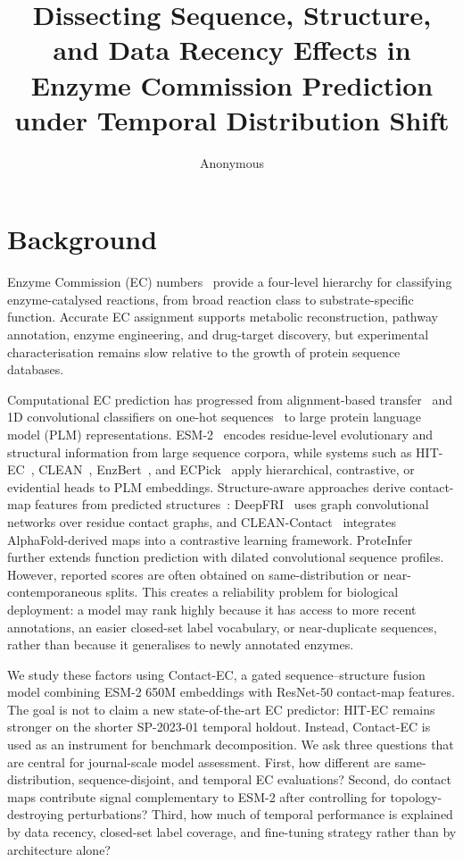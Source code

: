 \documentclass[numbered,contemporary,mediumone]{oup-authoring-template}
\title[Temporal EC Prediction]{Dissecting Sequence, Structure, and Data Recency Effects
in Enzyme Commission Prediction under Temporal Distribution Shift}
\author[1,$\ast$]{Anonymous}
\begin{document}
\maketitle
\thispagestyle{plain}
\pagestyle{plain}
\linenumbers

\section{Background}

Enzyme Commission (EC) numbers~\citep{mcdonald2023} provide a four-level hierarchy
for classifying enzyme-catalysed reactions, from broad reaction class to
substrate-specific function. Accurate EC assignment supports metabolic
reconstruction, pathway annotation, enzyme engineering, and drug-target
discovery, but experimental characterisation remains slow relative to the
growth of protein sequence databases.

Computational EC prediction has progressed from alignment-based
transfer~\citep{altschul1990} and 1D convolutional classifiers on one-hot
sequences~\citep{ryu2019,dalkiran2018} to large protein language model (PLM)
representations. ESM-2~\citep{lin2023} encodes residue-level evolutionary and
structural information from large sequence corpora, while systems such as
HIT-EC~\citep{dumontet2026}, CLEAN~\citep{yu2023}, EnzBert~\citep{buton2023},
and ECPick~\citep{han2024} apply hierarchical, contrastive, or evidential heads
to PLM embeddings. Structure-aware approaches derive contact-map features from
predicted structures~\citep{jumper2021,varadi2022}: DeepFRI~\citep{gligorijevic2021}
uses graph convolutional networks over residue contact graphs, and
CLEAN-Contact~\citep{ayres2024} integrates AlphaFold-derived maps into a
contrastive learning framework. ProteInfer~\citep{sanderson2023} further extends
function prediction with dilated convolutional sequence profiles. However,
reported scores are often obtained on same-distribution or near-contemporaneous
splits. This creates a reliability problem for biological deployment: a model
may rank highly because it has access to more recent annotations, an easier
closed-set label vocabulary, or near-duplicate sequences, rather than because
it generalises to newly annotated enzymes.

We study these factors using Contact-EC, a gated sequence--structure fusion model
combining ESM-2 650M embeddings with ResNet-50 contact-map features. The goal is
not to claim a new state-of-the-art EC predictor: HIT-EC remains stronger on the
shorter SP-2023-01 temporal holdout. Instead, Contact-EC is used as an instrument for benchmark
decomposition. We ask three questions that are central for journal-scale
model assessment. First, how different are same-distribution, sequence-disjoint,
and temporal EC evaluations? Second, do contact maps contribute signal
complementary to ESM-2 after controlling for topology-destroying perturbations?
Third, how much of temporal performance is explained by data recency,
closed-set label coverage, and fine-tuning strategy rather than by architecture alone?
\end{document}
